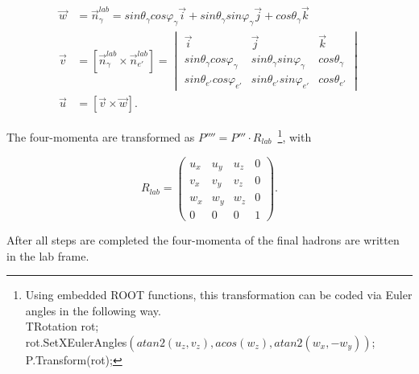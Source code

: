 \begin{enumerate}
\begin{equation}
\begin{split}
\overrightarrow{w} &= \overrightarrow{n}_{\gamma}^{lab} = sin\theta_{\gamma}cos\varphi_{\gamma}\overrightarrow{i}+sin\theta_{\gamma}sin\varphi_{\gamma}\overrightarrow{j}+cos\theta_{\gamma}\overrightarrow{k}\\
\overrightarrow{v} &= [\overrightarrow{n}_{\gamma}^{lab}\times \overrightarrow{n}_{e'}^{lab}] = \begin{vmatrix}
\overrightarrow{i} & \overrightarrow{j} & \overrightarrow{k}\\ 
sin\theta_{\gamma}cos\varphi_{\gamma} & sin\theta_{\gamma}sin\varphi_{\gamma} & cos\theta_{\gamma}\\ 
sin\theta_{e'}cos\varphi_{e'} &sin\theta_{e'}sin\varphi_{e'}  &cos\theta_{e'} 
\end{vmatrix}\\
\overrightarrow{u} &= [\overrightarrow{v}\times \overrightarrow{w}].
\end{split}
\end{equation}

\vspace{5em}
The four-momenta are transformed as $P'''' = P'''\cdot R_{lab}$~\footnote[5]{Using embedded ROOT functions, this transformation can be coded via Euler angles in the following way. \\ 
TRotation rot; \\
rot.SetXEulerAngles$( atan2\left (u_{z},v_{z} \right ),acos\left ( w_{z} \right ),atan2 \left (  w_{x},-w_{y} \right ) )$; \\
P.Transform(rot);
}, with
 
\begin{equation}
R_{lab} = \begin{pmatrix}
 u_{x}& u_{y} & u_{z} &0 \\ 
 v_{x}& v_{y} & v_{z} & 0\\ 
 w_{x}& w_{y} &  w_{z} &0 \\ 
 0&  0&  0&1 
\end{pmatrix}.
\end{equation}
\end{enumerate}


After all steps are completed the four-momenta of the final hadrons are written in the lab frame.
